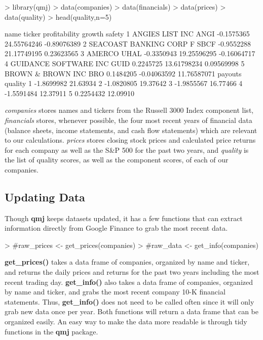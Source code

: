\documentclass[titlepage]{article}
\begin{document}
\begin{Schunk}
\begin{Sinput}
> library(qmj)
> data(companies) 
> data(financials) 
> data(prices) 
> data(quality)
> head(quality,n=5)
\end{Sinput}
\begin{Soutput}
                     name ticker profitability      growth      safety
1         ANGIES LIST INC   ANGI    -0.1575365 24.55764246 -0.89076389
2 SEACOAST BANKING CORP F   SBCF    -0.9552288 21.17749195  0.23623565
3                  AMERCO   UHAL    -0.3350943 19.25596295 -0.16064717
4   GUIDANCE SOFTWARE INC   GUID     0.2245725 13.61798234  0.09569998
5       BROWN & BROWN INC    BRO     0.1484205 -0.04063592 11.76587071
     payouts  quality
1 -1.8699982 21.63934
2 -1.0820805 19.37642
3 -1.9855567 16.77466
4 -1.5591484 12.37911
5  0.2254432 12.09910
\end{Soutput}
\end{Schunk}

\textit{companies} stores names and tickers from the Russell 3000 Index component list, \textit{financials} stores, whenever possible, the four most recent years of financial data (balance sheets, income statements, and cash flow statements) which are relevant to our calculations. \textit{prices} stores closing stock prices and calculated price returns for each company as well as the S\&P 500 for the past two years, and \textit{quality} is the list of quality scores, as well as the component scores, of each of our companies.

\subsection*{Updating Data}

Though \textbf{qmj} keeps datasets updated, it has a few functions that can extract information directly from Google Finance to grab the most recent data. 

\begin{Schunk}
\begin{Sinput}
> #raw_prices <- get_prices(companies)
> #raw_data <- get_info(companies)
\end{Sinput}
\end{Schunk}

\textbf{get\_prices()} takes a data frame of companies, organized by name and ticker, and returns the daily prices and returns for the past two years including the most recent trading day. \textbf{get\_info()} also takes a data frame of companies, organized by name and ticker, and grabs the most recent company 10-K financial statements. Thus, \textbf{get\_info()} does not need to be called often since it will only grab new data once per year. Both functions will return a data frame that can be organized easily. An easy way to make the data more readable is through tidy functions in the \textbf{qmj} package. 
\end{document}
